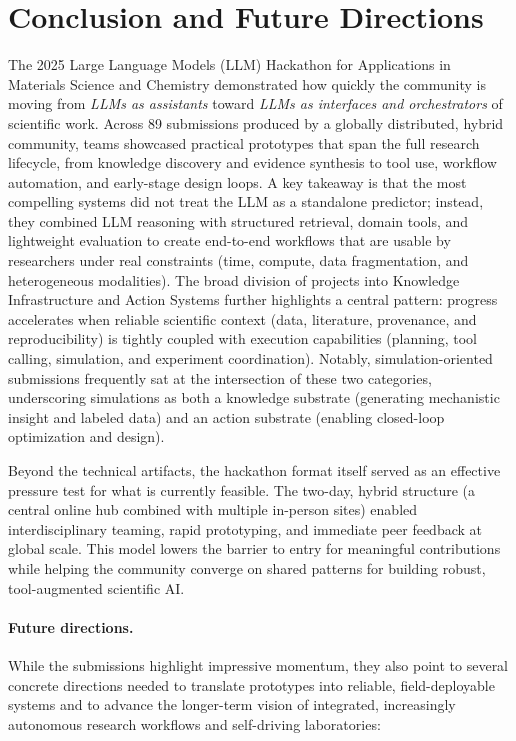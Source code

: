 \documentclass{article}
\begin{document}
\section*{Conclusion and Future Directions}
The 2025 Large Language Models (LLM) Hackathon for Applications in Materials Science and Chemistry
demonstrated how quickly the community is moving from \emph{LLMs as assistants} toward \emph{LLMs as
interfaces and orchestrators} of scientific work. Across 89 submissions produced by a globally distributed,
hybrid community, teams showcased practical prototypes that span the full research lifecycle, from
knowledge discovery and evidence synthesis to tool use, workflow automation, and early-stage design loops.
A key takeaway is that the most compelling systems did not treat the LLM as a standalone predictor; instead,
they combined LLM reasoning with structured retrieval, domain tools, and lightweight evaluation to create
end-to-end workflows that are usable by researchers under real constraints (time, compute, data
fragmentation, and heterogeneous modalities). The broad division of projects into Knowledge
Infrastructure and Action Systems further highlights a central pattern: progress accelerates when
reliable scientific context (data, literature, provenance, and reproducibility) is tightly coupled with execution
capabilities (planning, tool calling, simulation, and experiment coordination). Notably, simulation-oriented
submissions frequently sat at the intersection of these two categories, underscoring simulations as both a
knowledge substrate (generating mechanistic insight and labeled data) and an action substrate (enabling
closed-loop optimization and design).

Beyond the technical artifacts, the hackathon format itself served as an effective pressure test for what is
currently feasible. The two-day, hybrid structure (a central online hub combined with multiple in-person
sites) enabled interdisciplinary teaming, rapid prototyping, and immediate peer feedback at global scale.
This model lowers the barrier to entry for meaningful contributions while helping the community converge
on shared patterns for building robust, tool-augmented scientific AI.

\paragraph{Future directions.} While the submissions highlight impressive momentum, they also point to several concrete directions needed
to translate prototypes into reliable, field-deployable systems and to advance the longer-term vision of
integrated, increasingly autonomous research workflows and self-driving laboratories:
\end{document}
